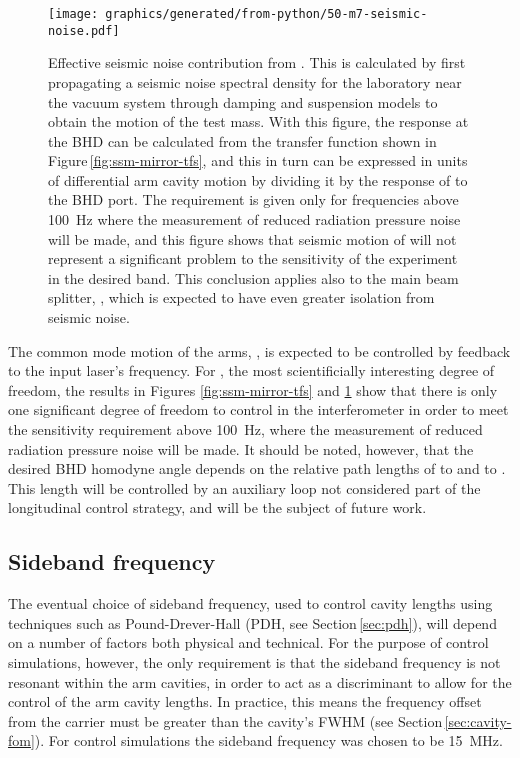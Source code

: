 \begin{figure}
  \centering
  \texttt{[image: graphics/generated/from-python/50-m7-seismic-noise.pdf]}
  \caption[Effective \LMINUS{} seismic noise contribution from \MSEVEN{}]{\label{fig:m7-seismic-noise}Effective \LMINUS{} seismic noise contribution from \MSEVEN{}. This is calculated by first propagating a seismic noise spectral density for the laboratory near the vacuum system through damping and suspension models to obtain the motion of the \MSEVEN{} test mass. With this figure, the response at the \gls{BHD} can be calculated from the transfer function shown in Figure\,\ref{fig:ssm-mirror-tfs}, and this in turn can be expressed in units of differential arm cavity motion by dividing it by the response of \LMINUS{} to the \gls{BHD} port. The requirement is given only for frequencies above \SI{100}{\hertz} where the measurement of reduced radiation pressure noise will be made, and this figure shows that seismic motion of \MSEVEN{} will not represent a significant problem to the sensitivity of the experiment in the desired band. This conclusion applies also to the main beam splitter, \MSIX{}, which is expected to have even greater isolation from seismic noise.}
\end{figure}

The common mode motion of the arms, \LPLUS{}, is expected to be controlled by feedback to the input laser's frequency. For \LMINUS{}, the most scientificially interesting degree of freedom, the results in Figures \ref{fig:ssm-mirror-tfs} and \ref{fig:m7-seismic-noise} show that there is only one significant degree of freedom to control in the interferometer in order to meet the sensitivity requirement above \SI{100}{\hertz}, where the measurement of reduced radiation pressure noise will be made. It should be noted, however, that the desired \gls{BHD} homodyne angle depends on the relative path lengths of \MELEVEN{} to \MSIXTEEN{} and \MSIX{} to \MSIXTEEN{}. This length will be controlled by an auxiliary loop not considered part of the longitudinal control strategy, and will be the subject of future work.

\subsection{Sideband frequency}
The eventual choice of sideband frequency, used to control cavity lengths using techniques such as Pound-Drever-Hall (\gls{PDH}, see Section\,\ref{sec:pdh}), will depend on a number of factors both physical and technical. For the purpose of control simulations, however, the only requirement is that the sideband frequency is not resonant within the arm cavities, in order to act as a discriminant to allow for the control of the arm cavity lengths. In practice, this means the frequency offset from the carrier must be greater than the cavity's \gls{FWHM} (see Section\,\ref{sec:cavity-fom}). For control simulations the sideband frequency was chosen to be \SI{15}{\mega\hertz}.

